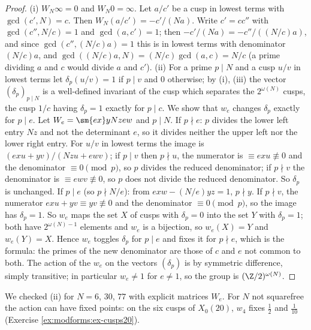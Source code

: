\begin{proof}
(i) $W_N\infty=0$ and $W_N0=\infty$. Let $a/c'$ be a cusp in lowest terms with $\gcd(c',N)=c$. Then $W_N(a/c')=-c'/(Na)$. Write $c'=cc''$ with $\gcd(c'',N/c)=1$ and $\gcd(a,c')=1$; then
$-c'/(Na)=-c''/((N/c)a)$, and since $\gcd(c'',(N/c)a)=1$ this is in lowest terms with denominator $(N/c)a$, and $\gcd((N/c)a,N)=(N/c)\gcd(a,c)=N/c$ (a prime dividing $a$ and $c$ would divide
$a$ and $c'$).
(ii) For a prime $p\mid N$ and a cusp $u/v$ in lowest terms let $\delta_p(u/v)=1$ if $p\mid v$ and $0$ otherwise; by (i), (iii) the vector $(\delta_p)_{p\mid N}$ is a
well-defined invariant of the cusp which separates the $2^{\omega(N)}$ cusps, the cusp $1/c$ having $\delta_p=1$ exactly for $p\mid c$. We show that $w_e$ changes $\delta_p$ exactly for $p\mid e$.
Let $W_e=\sm{ex}y{Nz}{ew}$ and $p\mid N$. If $p\nmid e$: $p$ divides the lower left entry $Nz$ and not the determinant $e$, so it divides neither the upper left nor the lower right entry.
For $u/v$ in lowest terms the image is $(exu+yv)/(Nzu+ewv)$; if $p\mid v$ then $p\nmid u$, the numerator is $\equiv exu\not\equiv0$ and the denominator $\equiv0\pmod p$, so $p$ divides the reduced
denominator; if $p\nmid v$ the denominator is $\equiv ewv\not\equiv0$, so $p$ does not divide the reduced denominator. So $\delta_p$ is unchanged. If $p\mid e$ (so $p\nmid N/e$): from
$exw-(N/e)yz=1$, $p\nmid y$. If $p\nmid v$, the numerator $exu+yv\equiv yv\not\equiv0$ and the denominator $\equiv0\pmod p$, so the image has $\delta_p=1$. So $w_e$ maps the set $X$ of
cusps with $\delta_p=0$ into the set $Y$ with $\delta_p=1$; both have $2^{\omega(N)-1}$ elements and $w_e$ is a bijection, so $w_e(X)=Y$ and $w_e(Y)=X$. Hence $w_e$ toggles $\delta_p$
for $p\mid e$ and fixes it for $p\nmid e$, which is the formula: the primes of the new denominator are those of $c$ and $e$ not common to both. The action of the $w_e$ on the vectors
$(\delta_p)$ is by symmetric difference, simply transitive; in particular $w_e\ne1$ for $e\ne1$, so the group is $(\Z/2)^{\omega(N)}$.
\end{proof}

We checked (ii) for $N=6$, $30$, $77$ with explicit matrices $W_e$. For $N$ not squarefree the action can have fixed points: on the six cusps of $X_0(20)$, $w_4$ fixes $\frac12$ and
$\frac1{10}$ (Exercise \ref{ex:modforms:ex-cusps20}).


